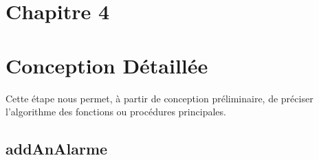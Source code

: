 \section*{Chapitre 4}
\section{Conception Détaillée}
\indent Cette étape nous permet, à partir de conception préliminaire, de préciser l'algorithme des fonctions ou procédures principales.

\subsection{addAnAlarme}
